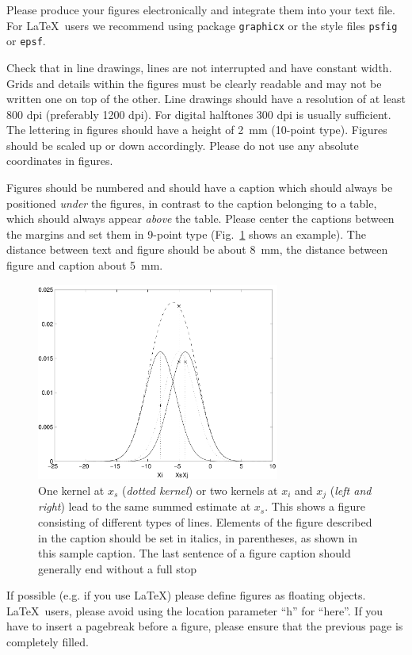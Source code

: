 \documentclass[runningheads]{llncs}
\begin{document}
Please produce your figures electronically and integrate
them into your text file. For \LaTeX\ users we recommend using package
\verb+graphicx+ or the style files \verb+psfig+ or \verb+epsf+.

Check that in line drawings, lines are not
interrupted and have constant width. Grids and details within the
figures must be clearly readable and may not be written one on top of
the other. Line drawings should have a resolution of at least 800 dpi
(preferably 1200 dpi).
For digital halftones 300 dpi is usually sufficient.
The lettering in figures should have a height of 2~mm (10-point type).
Figures should be scaled up or down accordingly.
Please do not use any absolute coordinates in figures.

Figures should be numbered and should have a caption which should
always be positioned {\it under} the figures, in contrast to the caption
belonging to a table, which should always appear {\it above} the table.
Please center the captions between the margins and set them in
9-point type
(Fig.~\ref{fig:example} shows an example).
The distance between text and figure should be about 8~mm, the
distance between figure and caption about 5~mm.
\begin{figure}
\centering
\includegraphics[height=6.5cm]{eijkel2}
\caption{One kernel at $x_s$ ({\it dotted kernel}) or two kernels at
$x_i$ and $x_j$ ({\it left and right}) lead to the same summed estimate
at $x_s$. This shows a figure consisting of different types of
lines. Elements of the figure described in the caption should be set in
italics,
in parentheses, as shown in this sample caption. The last
sentence of a figure caption should generally end without a full stop}
\label{fig:example}
\end{figure}

If possible (e.g. if you use \LaTeX) please define figures as floating
objects. \LaTeX\ users, please avoid using the location
parameter ``h'' for ``here''. If you have to insert a pagebreak before a
figure, please ensure that the previous page is completely filled.
\end{document}
